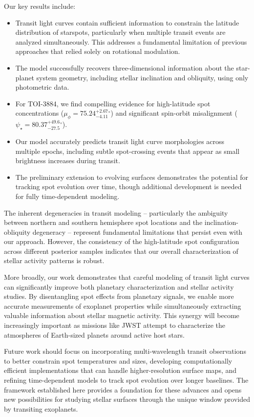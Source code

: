 \documentclass[twocolumn]{aastex631}
\begin{document}
Our key results include:
\begin{itemize}
    \item Transit light curves contain sufficient information to constrain the latitude distribution of starspots, particularly when multiple transit events are analyzed simultaneously. 
    This addresses a fundamental limitation of previous approaches that relied solely on rotational modulation.
    \item The model successfully recovers three-dimensional information about the star-planet system geometry, including stellar inclination and obliquity, using only photometric data. 
    \item For TOI-3884, we find compelling evidence for high-latitude spot concentrations ($\mu_\phi = 75.24^{+2.67}_{-4.11}$$^\circ$) and significant spin-orbit misalignment 
    ($\psi_\star = 80.37^{+49.6}_{-27.5}$$^\circ$).
    \item Our model accurately predicts transit light curve morphologies across multiple epochs, including subtle spot-crossing events that appear as small brightness increases during transit.
    \item The preliminary extension to evolving surfaces demonstrates the potential for tracking spot evolution over time, though additional development is needed for fully time-dependent modeling.
\end{itemize}
The inherent degeneracies in transit modeling -- particularly the ambiguity between northern and southern hemisphere spot locations and the inclination-obliquity degeneracy -- represent fundamental 
limitations that persist even with our approach. However, the consistency of the high-latitude spot configuration across different posterior samples indicates that our overall 
characterization of stellar activity patterns is robust.

More broadly, our work demonstrates that careful modeling of transit light curves can significantly improve both planetary characterization and stellar activity studies. 
By disentangling spot effects from planetary signals, we enable more accurate measurements of exoplanet properties while simultaneously extracting valuable information about stellar magnetic 
activity. This synergy will become increasingly important as missions like JWST attempt to characterize the atmospheres of Earth-sized planets around active host stars.

Future work should focus on incorporating multi-wavelength transit observations to better constrain spot temperatures and sizes, developing computationally efficient 
implementations that can handle higher-resolution surface maps, and refining time-dependent models to track spot evolution over longer baselines. 
The framework established here provides a foundation for these advances and opens new possibilities for studying stellar surfaces through 
the unique window provided by transiting exoplanets.
\end{document}

